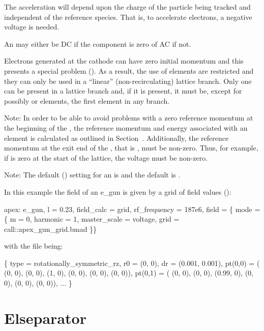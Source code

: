 The acceleration will depend upon the charge of the particle being tracked
and independent of the reference species. That is, to accelerate
electrons, a negative voltage is needed.

An  may either be DC if the  component is
zero of AC if not.

Electrons generated at the cathode can have zero initial momentum and
this presents a special problem (). As a result, the
use of  elements are restricted and they can only be used in
a ``linear'' (non-recirculating) lattice branch. Only one 
can be present in a lattice branch and, if it is present, it must be,
except for possibly  or  elements, the first
element in any branch.
 
Note: In order to be able to avoid problems with a zero reference
momentum at the beginning of the , the reference momentum
and energy associated with an  element is calculated as
outlined in Section~. Additionally, the reference
momentum at the exit end of the , that is , must be
non-zero. Thus, for example, if  is zero at the start of the
lattice, the  voltage must be non-zero. 

Note: The default  () setting for an
 is  and the default
 is .

In this example the field of an e_gun is given by a grid of field
values ():
\begin{example}
  apex: e_gun, l = 0.23, field_calc = grid, rf_frequency = 187e6, 
    field = \{ mode = \{
      m = 0, harmonic = 1,
      master_scale = voltage,
      grid = call::apex_gun_grid.bmad \}\}
\end{example}
with the file  being:
\begin{example}
  \{
    type = rotationally_symmetric_rz,
    r0 = (0, 0),
    dr = (0.001, 0.001),
    pt(0,0) = ( (0, 0), (0, 0), (1, 0),  (0, 0), (0, 0), (0, 0)),
    pt(0,1) = ( (0, 0), (0, 0), (0.99, 0),  (0, 0), (0, 0), (0, 0)),
    ... \}
\end{example}

\section{Elseparator}
\label{s:elsep}

